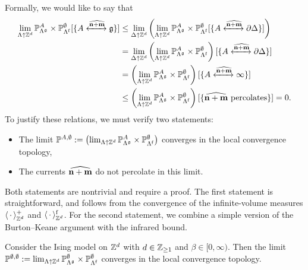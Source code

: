 Formally, we would like to say that
\begin{align}
    \lim_{\Lambda\uparrow\Z^d}
    \P_{\Lambda^\frakg}^A\times\P_{\Lambda^\f}^\emptyset
    [\{A \xleftrightarrow{\widehat{\n+\m}}\frakg\}]
    &
    \leq
    \lim_{\Delta\uparrow\Z^d}
    \left(
    \lim_{\Lambda\uparrow\Z^d}
    \P_{\Lambda^\frakg}^A\times\P_{\Lambda^\f}^\emptyset
    [\{A \xleftrightarrow{\widehat{\n+\m}}\partial\Delta\}]
    \right) 
    \\&
    =
    \lim_{\Delta\uparrow\Z^d}
    \left(
    \lim_{\Lambda\uparrow\Z^d}
    \P_{\Lambda^\frakg}^A\times\P_{\Lambda^\f}^\emptyset
    \right)
    [\{A \xleftrightarrow{\widehat{\n+\m}}\partial\Delta\}]
    \\&
    =
    \left(
    \lim_{\Lambda\uparrow\Z^d}
    \P_{\Lambda^\frakg}^A\times\P_{\Lambda^\f}^\emptyset
    \right)
    [\{A \xleftrightarrow{\widehat{\n+\m}}\infty\}]
    \\&\leq
    \left(
    \lim_{\Lambda\uparrow\Z^d}
    \P_{\Lambda^\frakg}^A\times\P_{\Lambda^\f}^\emptyset
    \right)
    [\{\text{$\widehat{\n+\m}$ percolates}\}]=0.
\end{align}
To justify these relations, we must verify two statements:
\begin{itemize}
    \item The limit $\mathbb P^{A,\emptyset}:=\left(
        \lim_{\Lambda\uparrow\mathbb Z^d}
        \mathbb P_{\Lambda^\mathfrak g}^A\times\mathbb P_{\Lambda^{\operatorname{f}}}^\emptyset\right)
        $ converges in the local convergence topology,
    \item The currents $\widehat{\mathbf{n}+\mathbf{m}}$ do not percolate in this limit.
\end{itemize}

Both statements are nontrivial and require a proof.
The first statement is straightforward, and follows
from the convergence of the infinite-volume measures $\langle\,\cdot\,\rangle^+_{\mathbb Z^d}$
and $\langle\,\cdot\,\rangle^{\operatorname{f}}_{\mathbb Z^d}$.
For the second statement, we combine a simple version of the Burton--Keane argument
with the infrared bound.


\begin{lemma}\label{lemma:continuity_step2b}
    Consider the Ising model on $\mathbb Z^d$ with $d\in\mathbb Z_{\geq 1}$
    and $\beta\in[0,\infty)$.
    Then the limit $\mathbb P^{\emptyset,\emptyset}:=
        \lim_{\Lambda\uparrow\mathbb Z^d}
        \mathbb P_{\Lambda^\mathfrak g}^\emptyset\times\mathbb P_{\Lambda^{\operatorname{f}}}^\emptyset
        $ converges in the local convergence topology.
\end{lemma}


